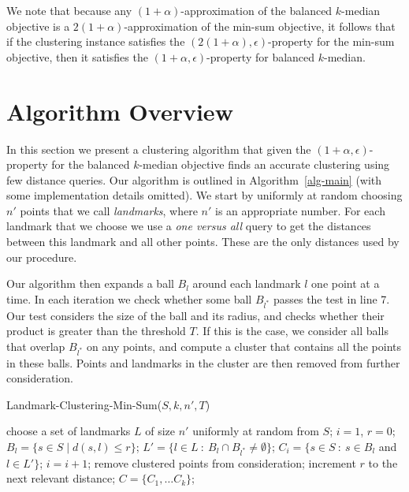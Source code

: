 \documentclass{llncs} \usepackage{algorithm}
\begin{document}
We note that because any $(1+\alpha)$-approximation of the balanced $k$-median objective is a $2(1+\alpha)$-approximation of the min-sum objective, it follows that if the clustering instance satisfies the $(2(1+\alpha),\epsilon)$-property for the min-sum objective, then it satisfies the $(1+\alpha,\epsilon)$-property for balanced $k$-median.

\section{Algorithm Overview}

In this section we present a clustering algorithm that given the $(1+\alpha,\epsilon)$-property for the balanced $k$-median objective finds an accurate clustering using few distance queries.   Our algorithm is outlined in Algorithm~\ref{alg-main} (with some implementation details omitted).  We start by uniformly at random choosing $n'$ points that we call \emph{landmarks}, where $n'$ is an appropriate number.  For each landmark that we choose we use a \emph{one versus all} query to get the distances between this landmark and all other points.  These are the only distances used by our procedure.

Our algorithm then expands a ball $B_{l}$ around each landmark $l$ one point at a time.  In each iteration we check whether some ball $B_{l^{\ast}}$ passes the test in line 7.  Our test considers the size of the ball and its radius, and checks whether their product is greater than the threshold $T$.  If this is the case, we consider all balls that overlap $B_{l^{\ast}}$ on any points, and compute a cluster that contains all the points in these balls.  Points and landmarks in the cluster are then removed from further consideration.

\vspace{-0.5cm}
\begin{algorithm}[H]
\caption{Landmark-Clustering-Min-Sum($S,k,n',T$)}
\begin{algorithmic}[1]
\STATE choose a set of landmarks $L$ of size $n'$ uniformly at random from $S$;
\STATE $i=1$, $r = 0$;
\STATE $B_{l} = \{s \in S \mid d(s,l) \le r \}$;
\ENDFOR
{}
\STATE $L' = \lbrace l \in L \ \colon \ B_{l} \cap B_{l^{\ast}} \ne \emptyset \rbrace$;
\STATE $C_{i} = \lbrace s \in S \ \colon \ s \in B_{l}$ and $l \in L' \rbrace$;
\STATE $i=i+1$;
\STATE remove clustered points from consideration;
\ENDIF
\STATE increment $r$ to the next relevant distance;
\ENDWHILE
\RETURN $C = \lbrace C_{1},\ldots C_{k} \rbrace$;
\end{algorithmic}
\label{alg-main}
\end{algorithm}
\vspace{-0.5cm}
\end{document}
